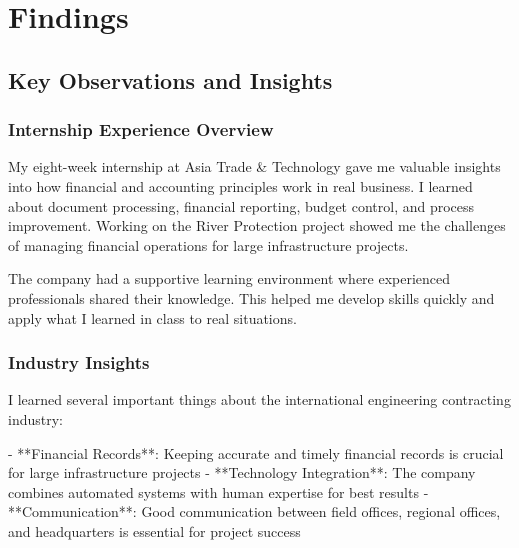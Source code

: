 
\chapter{Findings}

\section{Key Observations and Insights}

\subsection{Internship Experience Overview}
My eight-week internship at Asia Trade \& Technology gave me valuable insights into how financial and accounting principles work in real business. I learned about document processing, financial reporting, budget control, and process improvement. Working on the River Protection project showed me the challenges of managing financial operations for large infrastructure projects.

The company had a supportive learning environment where experienced professionals shared their knowledge. This helped me develop skills quickly and apply what I learned in class to real situations.

\subsection{Industry Insights}
I learned several important things about the international engineering contracting industry:

- **Financial Records**: Keeping accurate and timely financial records is crucial for large infrastructure projects
- **Technology Integration**: The company combines automated systems with human expertise for best results
- **Communication**: Good communication between field offices, regional offices, and headquarters is essential for project success

